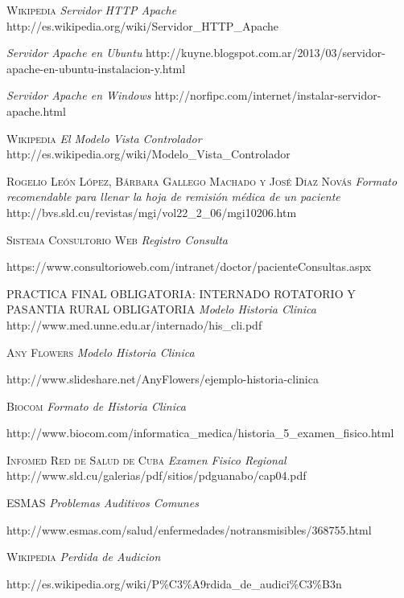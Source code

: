 \begin{thebibliography}{X}

     \textsc{Wikipedia} \textit{Servidor HTTP Apache} http://es.wikipedia.org/wiki/Servidor\_HTTP\_Apache 

     \textit{Servidor Apache en Ubuntu} http://kuyne.blogspot.com.ar/2013/03/servidor-apache-en-ubuntu-instalacion-y.html     

     \textit{Servidor Apache en Windows} http://norfipc.com/internet/instalar-servidor-apache.html

     \textsc{Wikipedia} \textit{El Modelo Vista Controlador} http://es.wikipedia.org/wiki/Modelo\_Vista\_Controlador

     \textsc{Rogelio León López, Bárbara Gallego Machado y José Díaz Novás} \textit{Formato recomendable para llenar la hoja de remisión médica de un paciente} http://bvs.sld.cu/revistas/mgi/vol22\_2\_06/mgi10206.htm 

     \textsc{Sistema Consultorio Web} \textit{Registro Consulta}

    https://www.consultorioweb.com/intranet/doctor/pacienteConsultas.aspx
    
     \textsc{PRACTICA FINAL OBLIGATORIA: INTERNADO ROTATORIO Y PASANTIA RURAL OBLIGATORIA} \textit{Modelo Historia Clinica} http://www.med.unne.edu.ar/internado/his\_cli.pdf
    
     \textsc{Any Flowers} \textit{Modelo Historia Clinica}

    http://www.slideshare.net/AnyFlowers/ejemplo-historia-clinica
    
     \textsc{Biocom} \textit{Formato de Historia Clinica}

    http://www.biocom.com/informatica\_medica/historia\_5\_examen\_fisico.html
    
     \textsc{Infomed Red de Salud de Cuba} \textit{Examen Fisico Regional} http://www.sld.cu/galerias/pdf/sitios/pdguanabo/cap04.pdf
    
     \textsc{ESMAS} \textit{Problemas Auditivos Comunes}
    
    http://www.esmas.com/salud/enfermedades/notransmisibles/368755.html
    
     \textsc{Wikipedia} \textit{Perdida de Audicion}

    http://es.wikipedia.org/wiki/P\%C3\%A9rdida\_de\_audici\%C3\%B3n


\end{thebibliography}
